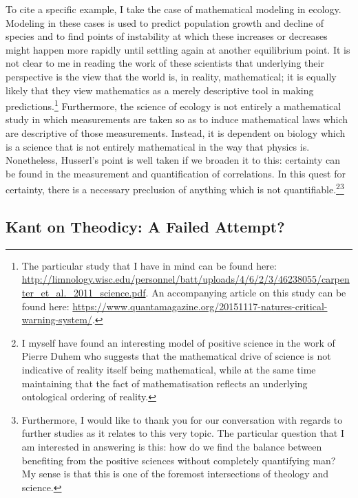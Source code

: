 \documentclass[12pt]{article}
\begin{document}
	 To cite a specific example, I take the case of mathematical modeling in ecology. Modeling in these cases is used to predict population growth and decline of species and to find points of instability at which these increases or decreases might happen more rapidly until settling again at another equilibrium point. It is not clear to me in reading the work of these scientists that underlying their perspective is the view that the world is, in reality, mathematical; it is equally likely that they view mathematics as a merely descriptive tool in making predictions.\footnote{The particular study that I have in mind can be found here: \url{http://limnology.wisc.edu/personnel/batt/uploads/4/6/2/3/46238055/carpenter_et_al._2011_science.pdf}. An accompanying article on this study can be found here: \url{https://www.quantamagazine.org/20151117-natures-critical-warning-system/}.} Furthermore, the science of ecology is not entirely a mathematical study in which measurements are taken so as to induce mathematical laws which are descriptive of those measurements. Instead, it is dependent on biology which is a science that is not entirely mathematical in the way that physics is. Nonetheless, Husserl's point is well taken if we broaden it to this: certainty can be found in the measurement and quantification of correlations. In this quest for certainty, there is a necessary preclusion of anything which is not quantifiable.\footnote{I myself have found an interesting model of positive science in the work of Pierre Duhem who suggests that the mathematical drive of science is not indicative of reality itself being mathematical, while at the same time maintaining that the fact of mathematisation reflects an underlying ontological ordering of reality.}\thinspace \footnote{Furthermore, I would like to thank you for our conversation with regards to further studies as it relates to this very topic. The particular question that I am interested in answering is this: how do we find the balance between benefiting from the positive sciences without completely quantifying man? My sense is that this is one of the foremost intersections of theology and science.}
	 
	 

	\subsection*{Kant on Theodicy: A Failed Attempt?}
	
\end{document}
